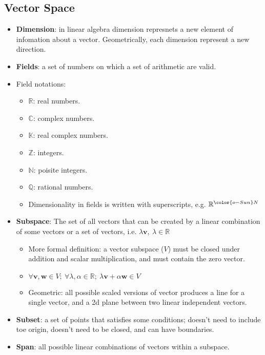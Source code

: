 \documentclass[12pt,a4paper]{article}
\begin{document}
\subsection{Vector Space}
\begin{itemize}
    \item \textbf{Dimension}: in linear algebra dimension represnets a {\color{o-Sun}new element} of infomation about a vector. Geometrically, each dimension represent a {\color{o-Sun}new direction}.
    \item \textbf{Fields}: a set of numbers on which a set of arithmetic are valid.
    \item Field notations:
        \begin{itemize}
            \item $\mathbb{R}$: real numbers.
            \item $\mathbb{C}$: complex numbers.
            \item $\mathbb{K}$: real complex numbers.
            \item $\mathbb{Z}$: integers.
            \item $\mathbb{N}$: poisite integers.
            \item $\mathbb{Q}$: rational numbers.
            \item Dimensionality in fields is written with superscripts, e.g. \(\mathbb{R}^{\color{o-Sun}N}\)
        \end{itemize}
    \item \textbf{Subspace}: The set of all vectors that can be created by a linear combination of some vectors or a set of vectors, i.e. {\color{o-Sun}\(\lambda\bm{v},~\lambda\in\mathbb{R}\)}
    \begin{itemize}
        \item More formal definition: a vector subspace (\(V\)) must be closed under addition and scalar multiplication, and must contain the zero vector.
        \item {\color{o-Sun}\(\forall\bm{v}, \bm{w} \in V;~ \forall\lambda,\alpha\in\mathbb{R};~ \lambda\bm{v}+\alpha\bm{w}\in V\)}
        \item Geometric: all possible scaled versions of vector produces a line for a single vector, and a 2d plane between two linear independent vectors.
    \end{itemize}
    \item \textbf{Subset}: a set of points that satisfies some conditions; doesn't need to include toe origin, doesn't need to be closed, and can have boundaries.
    \item \textbf{Span}: all possible linear combinations of vectors within a subspace. 

\end{itemize}
\end{document}
